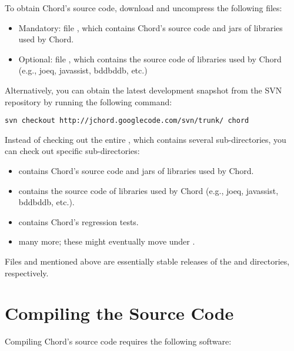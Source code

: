 To obtain Chord's source code, download and uncompress the following
files:

\begin{itemize}
\item
Mandatory: file
,
which contains Chord's source code and jars of libraries used by
Chord.
\item
Optional: file
,
which contains the source code of libraries used by Chord (e.g., joeq,
javassist, bddbddb, etc.)
\end{itemize}

Alternatively, you can obtain the latest development snapshot from the
SVN repository by running the following command:

\begin{framed}
\begin{verbatim}
svn checkout http://jchord.googlecode.com/svn/trunk/ chord
\end{verbatim}
\end{framed}

Instead of checking out the entire , which contains
several sub-directories, you can check out specific sub-directories:

\begin{itemize}
\item
{} contains Chord's source code and jars of libraries used by Chord.
\item
{} contains the source code of libraries used by Chord
(e.g., joeq, javassist, bddbddb, etc.).
\item
{} contains Chord's regression tests.
\item
many more; these might eventually move under .
\end{itemize}

Files  and 
mentioned above are essentially stable releases of the 
and  directories, respectively.

\section{Compiling the Source Code}
\label{sec:compiling-sources}

Compiling Chord's source code requires the following software:

